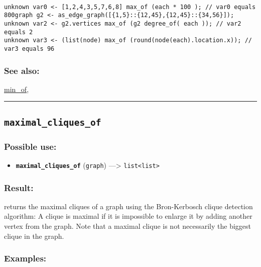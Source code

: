 \documentclass[]{book}
\providecommand{\tightlist}{%
  \setlength{\itemsep}{0pt}\setlength{\parskip}{0pt}}
\theoremstyle{definition}
\theoremstyle{definition}
\theoremstyle{definition}
\theoremstyle{remark}
\begin{document}
\begin{verbatim}
 
unknown var0 <- [1,2,4,3,5,7,6,8] max_of (each * 100 ); // var0 equals 800graph g2 <- as_edge_graph([{1,5}::{12,45},{12,45}::{34,56}]);  
unknown var2 <- g2.vertices max_of (g2 degree_of( each )); // var2 equals 2 
unknown var3 <- (list(node) max_of (round(node(each).location.x)); // var3 equals 96
\end{verbatim}

\subsubsection{See also:}\label{see-also-135}

\href{OperatorsIM\#min_of}{min\_of},

\begin{center}\rule{0.5\linewidth}{\linethickness}\end{center}

\subsection{\texorpdfstring{\texttt{maximal\_cliques\_of}}{maximal\_cliques\_of}}\label{maximal_cliques_of}

\subsubsection{Possible use:}\label{possible-use-342}

\begin{itemize}
\tightlist
\item
  \textbf{\texttt{maximal\_cliques\_of}} (\texttt{graph})
  ---\textgreater{} \texttt{list\textless{}list\textgreater{}}
\end{itemize}

\subsubsection{Result:}\label{result-331}

returns the maximal cliques of a graph using the Bron-Kerbosch clique
detection algorithm: A clique is maximal if it is impossible to enlarge
it by adding another vertex from the graph. Note that a maximal clique
is not necessarily the biggest clique in the graph.

\subsubsection{Examples:}\label{examples-235}
\end{document}
